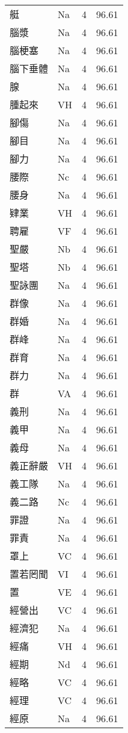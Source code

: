 \documentclass[twocolumn]{book}
\begin{document}
\begin{supertabular}{llrr}
艇 & Na & 4 &  96.61\\
腦漿 & Na & 4 &  96.61\\
腦梗塞 & Na & 4 &  96.61\\
腦下垂體 & Na & 4 &  96.61\\
腺 & Na & 4 &  96.61\\
腫起來 & VH & 4 &  96.61\\
腳傷 & Na & 4 &  96.61\\
腳目 & Na & 4 &  96.61\\
腳力 & Na & 4 &  96.61\\
腰際 & Nc & 4 &  96.61\\
腰身 & Na & 4 &  96.61\\
肄業 & VH & 4 &  96.61\\
聘雇 & VF & 4 &  96.61\\
聖嚴 & Nb & 4 &  96.61\\
聖塔 & Nb & 4 &  96.61\\
聖詠團 & Na & 4 &  96.61\\
群像 & Na & 4 &  96.61\\
群婚 & Na & 4 &  96.61\\
群峰 & Na & 4 &  96.61\\
群育 & Na & 4 &  96.61\\
群力 & Na & 4 &  96.61\\
群 & VA & 4 &  96.61\\
義刑 & Na & 4 &  96.61\\
義甲 & Na & 4 &  96.61\\
義母 & Na & 4 &  96.61\\
義正辭嚴 & VH & 4 &  96.61\\
義工隊 & Na & 4 &  96.61\\
義二路 & Nc & 4 &  96.61\\
罪證 & Na & 4 &  96.61\\
罪責 & Na & 4 &  96.61\\
罩上 & VC & 4 &  96.61\\
置若罔聞 & VI & 4 &  96.61\\
置 & VE & 4 &  96.61\\
經營出 & VC & 4 &  96.61\\
經濟犯 & Na & 4 &  96.61\\
經痛 & VH & 4 &  96.61\\
經期 & Nd & 4 &  96.61\\
經略 & VC & 4 &  96.61\\
經理 & VC & 4 &  96.61\\
經原 & Na & 4 &  96.61\\

\end{supertabular}
\end{document}
